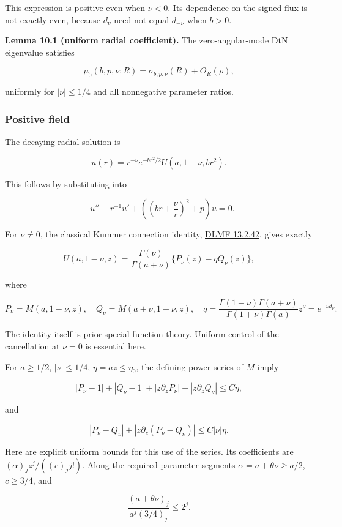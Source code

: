 \documentclass[11pt]{article}
\begin{document}
This expression is positive even when \(\nu<0\). Its dependence on the
signed flux is not exactly even, because \(d_\nu\) need not equal
\(d_{-\nu}\) when \(b>0\).

\textbf{Lemma 10.1 (uniform radial coefficient).} The zero-angular-mode
DtN eigenvalue satisfies

\[\mu_0(b,p,\nu;R)=\sigma_{b,p,\nu}(R)+O_R(\rho),\tag{F5}\]

uniformly for \(|\nu|\leq1/4\) and all nonnegative parameter ratios.

\subsubsection{Positive field}\label{positive-field}

The decaying radial solution is

\[u(r)=r^{-\nu}e^{-br^2/2}U(a,1-\nu,br^2).\]

This follows by substituting into

\[-u''-r^{-1}u'+\left(\left(br+\frac\nu r\right)^2+p\right)u=0.\]

For \(\nu\neq0\), the classical Kummer connection identity,
\href{https://dlmf.nist.gov/13.2.E42}{DLMF 13.2.42}, gives exactly

\[U(a,1-\nu,z)=\frac{\Gamma(\nu)}{\Gamma(a+\nu)}\{P_\nu(z)-qQ_\nu(z)\},\tag{F6}\]

where

\[P_\nu=M(a,1-\nu,z),\quad Q_\nu=M(a+\nu,1+\nu,z),\quad
q=\frac{\Gamma(1-\nu)\Gamma(a+\nu)}{\Gamma(1+\nu)\Gamma(a)}z^\nu
=e^{-\nu d_\nu}.\]

The identity itself is prior special-function theory. Uniform control of
the cancellation at \(\nu=0\) is essential here.

For \(a\geq1/2\), \(|\nu|\leq1/4\), \(\eta=az\leq\eta_0\), the defining
power series of \(M\) imply

\[|P_\nu-1|+|Q_\nu-1|+|z\partial_zP_\nu|+|z\partial_zQ_\nu|\leq C\eta,\tag{F7}\]

and

\[|P_\nu-Q_\nu|+|z\partial_z(P_\nu-Q_\nu)|\leq C|\nu|\eta.\tag{F8}\]

Here are explicit uniform bounds for this use of the series. Its
coefficients are \((\alpha)_jz^j/((c)_j j!)\). Along the required
parameter segments \(\alpha=a+\theta\nu\geq a/2\), \(c\geq3/4\), and

\[\frac{(a+\theta\nu)_j}{a^j(3/4)_j}\leq2^j.\]
\end{document}
